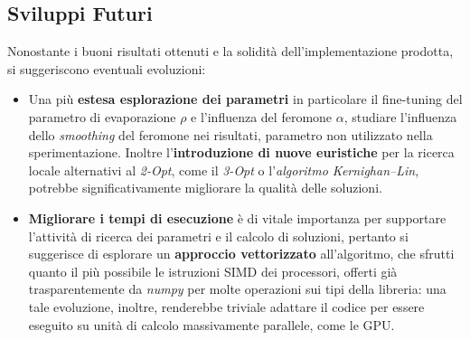 \documentclass[11pt,a4paper]{article}
\begin{document}
\subsection{Sviluppi Futuri}
Nonostante i buoni risultati ottenuti e la solidità dell'implementazione prodotta, si suggeriscono eventuali evoluzioni:
\begin{itemize}
    \item Una più \textbf{estesa esplorazione dei parametri}  in particolare il fine-tuning del parametro di evaporazione $\rho$  e l'influenza del feromone $\alpha$, studiare l'influenza dello \textit{smoothing} del feromone\cite{STUTZLE2000889} nei risultati, parametro non utilizzato nella sperimentazione. Inoltre l'\textbf{introduzione di nuove euristiche} per la ricerca locale alternativi al \textit{2-Opt}, come il \textit{3-Opt} o l'\textit{algoritmo Kernighan–Lin}, potrebbe significativamente migliorare la qualità delle soluzioni.
    \item \textbf{Migliorare i tempi di esecuzione} è di vitale importanza per supportare l'attività di ricerca dei parametri e il calcolo di soluzioni, pertanto si suggerisce di esplorare un \textbf{approccio vettorizzato} all'algoritmo, che sfrutti quanto il più possibile le istruzioni SIMD dei processori, offerti già trasparentemente da \textit{numpy} per molte operazioni sui tipi della libreria: una tale evoluzione, inoltre, renderebbe triviale adattare il codice per essere eseguito su unità di calcolo massivamente parallele, come le GPU.
\end{itemize}



\printbibliography %
\end{document}
